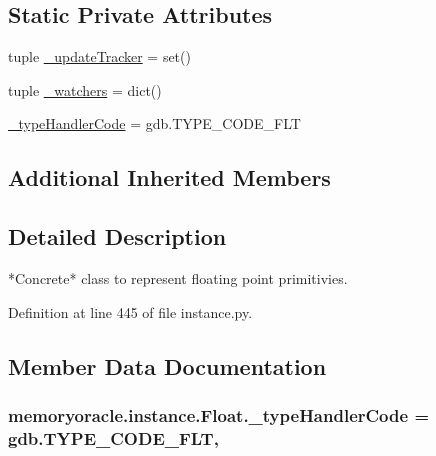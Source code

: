 \subsection*{Static Private Attributes}
\begin{DoxyCompactItemize}
\item 
tuple \hyperlink{classmemoryoracle_1_1instance_1_1Float_a2de362a0f4b3b80cfcb0ad7d09cd1462}{\+\_\+update\+Tracker} = set()
\item 
tuple \hyperlink{classmemoryoracle_1_1instance_1_1Float_a41aab3bf3c399c2a8762081fc3b326ee}{\+\_\+watchers} = dict()
\item 
\hyperlink{classmemoryoracle_1_1instance_1_1Float_ac8210ee0f50a53fff0d84f4a80335250}{\+\_\+type\+Handler\+Code} = gdb.\+T\+Y\+P\+E\+\_\+\+C\+O\+D\+E\+\_\+\+F\+L\+T
\end{DoxyCompactItemize}
\subsection*{Additional Inherited Members}


\subsection{Detailed Description}
\begin{DoxyVerb}*Concrete* class to represent floating point primitivies.
\end{DoxyVerb}
 

Definition at line 445 of file instance.\+py.



\subsection{Member Data Documentation}
\hypertarget{classmemoryoracle_1_1instance_1_1Float_ac8210ee0f50a53fff0d84f4a80335250}{}
\subsubsection[{\+\_\+type\+Handler\+Code}]{\setlength{\rightskip}{0pt plus 5cm}memoryoracle.\+instance.\+Float.\+\_\+type\+Handler\+Code = gdb.\+T\+Y\+P\+E\+\_\+\+C\+O\+D\+E\+\_\+\+F\+L\+T\hspace{0.3cm}{\ttfamily [static]}, {\ttfamily [private]}}\label{classmemoryoracle_1_1instance_1_1Float_ac8210ee0f50a53fff0d84f4a80335250}


